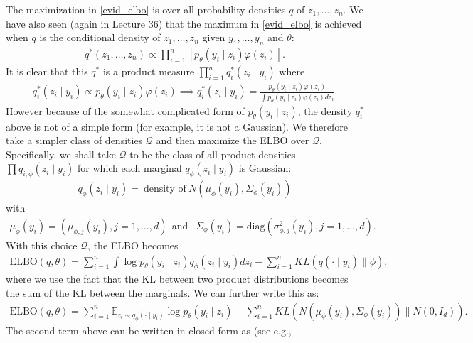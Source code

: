 \documentclass{scrartcl}
\newcommand{\E}{{\mathbb E}}
\newcommand{\Qcal}{{\mathcal{Q}}}
\begin{document}
The maximization in \eqref{evid_elbo} is over all probability
densities $q$ of $z_1, \dots, z_n$. We have also seen (again in Lecture 36)
that the maximum in \eqref{evid_elbo} is achieved when $q$ is the
conditional density of $z_1, \dots, z_n$  given $y_1, \dots, y_n$ and
$\theta$:
\begin{align*}
  q^*(z_1, \dots, z_n) \propto \prod_{i=1}^n\left[ p_{\theta}(y_i \mid z_i)
  \varphi(z_i) \right]. 
\end{align*}
It is clear that this $q^*$ is a product measure $\prod_{i=1}^n
q_i^*(z_i \mid y_i)$ where
\begin{align*}
 q_i^*(z_i \mid y_i)  \propto p_{\theta}(y_i \mid z_i)
  \varphi(z_i) \implies  q_i^*(z_i \mid y_i)  = \frac{p_{\theta}(y_i \mid z_i)
  \varphi(z_i)}{\int p_{\theta}(y_i \mid z_i)
  \varphi(z_i) dz_i}. 
\end{align*}
However because of the somewhat complicated form of $p_{\theta}(y_i
\mid z_i)$, the density $q_i^*$ above is not of a simple form (for
example, it is not a Gaussian). We therefore take a simpler class of
densities $\Qcal$ and then maximize the ELBO over
$\Qcal$. Specifically, we shall take $\Qcal$ to be the class of all
product densities $\prod q_{i, \phi}(z_i \mid y_i)$ for which each
marginal $q_{\phi}(z_i \mid y_i)$ is Gaussian: 
\begin{align*}
  q_{\phi}(z_i \mid y_i) = ~\text{density of}~ N(\mu_{\phi}(y_i),
  \Sigma_{\phi}(y_i)) 
\end{align*}
with
\begin{align*}
  \mu_{\phi}(y_i) = (\mu_{\phi, j}(y_i), j = 1, \dots, d) ~~ \text{
  and } ~~ \Sigma_{\phi}(y_i) = \text{diag} \left(\sigma^2_{\phi, j}(y_i),
  j = 1, \dots, d \right). 
\end{align*}
With this choice $\Qcal$, the ELBO becomes
\begin{align*}
  \text{ELBO}(q, \theta) = \sum_{i=1}^n \int \log p_{\theta}(y_i \mid
  z_i) q_{\phi}(z_i \mid y_i) dz_i - \sum_{i=1}^n KL(q(\cdot \mid y_i)
  \| \phi),
\end{align*}
where we use the fact that the KL between two product distributions
becomes the sum of the KL between the marginals. We can further write
this as: 
\begin{align*}
  \text{ELBO}(q, \theta) = \sum_{i=1}^n \E_{z_i \sim q_{\phi}(\cdot
  \mid y_i)} \log p_{\theta}(y_i \mid z_i) - \sum_{i=1}^n
  KL(N(\mu_{\phi}(y_i), \Sigma_{\phi}(y_i))
  \| N(0, I_d)). 
\end{align*}
The second term above can be written in closed form as (see e.g.,
\end{document}
